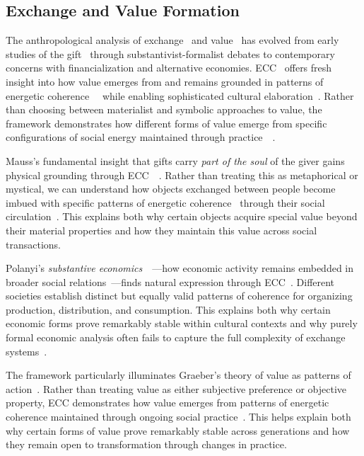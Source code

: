\subsection*{Exchange and Value Formation}

The anthropological analysis of exchange~ and value~ has evolved from early studies of the gift~ through substantivist-formalist debates to contemporary concerns with financialization and alternative economies. ECC~ offers fresh insight into how value emerges from and remains grounded in patterns of energetic coherence~~ while enabling sophisticated cultural elaboration~\cite{mauss1925gift,gregory1982gifts}. Rather than choosing between materialist and symbolic approaches to value, the framework demonstrates how different forms of value emerge from specific configurations of social energy maintained through practice~~\cite{mauss1925gift,gregory1982gifts}.

Mauss's fundamental insight that gifts carry \textit{part of the soul} of the giver gains physical grounding through ECC~~\cite{mauss1925gift}. Rather than treating this as metaphorical or mystical, we can understand how objects exchanged between people become imbued with specific patterns of energetic coherence~ through their social circulation~\cite{miller2005materiality}. This explains both why certain objects acquire special value beyond their material properties and how they maintain this value across social transactions.

Polanyi's \textit{substantive economics}~~\cite{polanyi1944great}—how economic activity remains embedded in broader social relations~—finds natural expression through ECC~\cite{tsing2015mushroom}. Different societies establish distinct but equally valid patterns of coherence for organizing production, distribution, and consumption. This explains both why certain economic forms prove remarkably stable within cultural contexts and why purely formal economic analysis often fails to capture the full complexity of exchange systems~.

The framework particularly illuminates Graeber's theory of value as patterns of action~\cite{graeber2001toward}. Rather than treating value as either subjective preference or objective property, ECC demonstrates how value emerges from patterns of energetic coherence maintained through ongoing social practice~\cite{ingold2011being}. This helps explain both why certain forms of value prove remarkably stable across generations and how they remain open to transformation through changes in practice.


